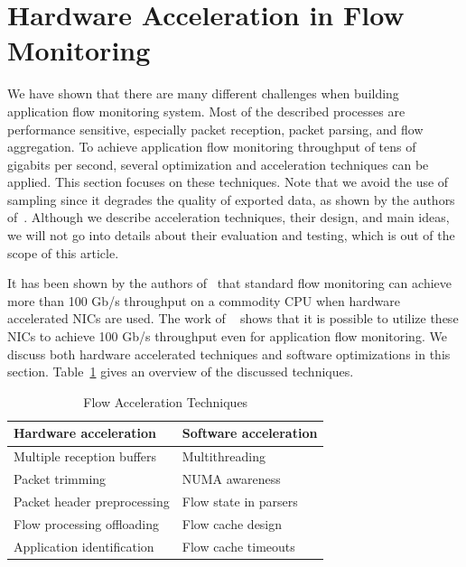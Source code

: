 \section{Hardware Acceleration in Flow Monitoring}\label{sec:performance-hw-acceleration}


We have shown that there are many different challenges when building application flow monitoring system. Most of the described processes are performance sensitive, especially packet reception, packet parsing, and flow aggregation. To achieve application flow monitoring throughput of tens of gigabits per second, several optimization and acceleration techniques can be applied. This section focuses on these techniques. Note that we avoid the use of sampling since it degrades the quality of exported data, as shown by the authors of~\cite{Brauckhoff-2006-Impact}. Although we describe acceleration techniques, their design, and main ideas, we will not go into details about their evaluation and testing, which is out of the scope of this article. 

It has been shown by the authors of~\cite{Velan-2015-High} that standard flow monitoring can achieve more than 100 Gb/s throughput on a commodity CPU when hardware accelerated NICs are used. The work of \citeauthor{Kekely-2016-Software}~\cite{Kekely-2016-Software} shows that it is possible to utilize these NICs to achieve 100 Gb/s throughput even for application flow monitoring. We discuss both hardware accelerated techniques and software optimizations in this section. Table~\ref{tab:flow-acc-techniques} gives an overview of the discussed techniques.

\begin{table}[ht!]
    \centering
    \begin{tabular}{|l|l|}
    \hline
    \textbf{Hardware acceleration} & \textbf{Software acceleration} \\ \hline
    Multiple reception buffers & Multithreading \\
    Packet trimming & NUMA awareness \\
    Packet header preprocessing & Flow state in parsers \\
    Flow processing offloading & Flow cache design \\
    Application identification & Flow cache timeouts \\ \hline
    \end{tabular}
    \caption{Flow Acceleration Techniques}
    \label{tab:flow-acc-techniques}
\end{table}


